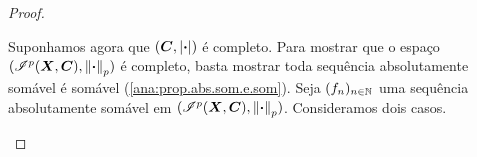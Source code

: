 \begin{proof}
\begin{enumerate}
Suponhamos agora que $(\bm C,\left\vert{\bm{\cdot}}\right\vert)$ é completo. Para mostrar que o espaço $(\mathscr{I}^p(\bm X,\bm C),\left\Vert{\bm{\cdot}}\right\Vert_p)$ é completo, basta mostrar toda sequência absolutamente somável é somável (\ref{ana:prop.abs.som.e.som}). Seja $(f_n)_{n \in \mathbb{N}}$ uma sequência absolutamente somável em $(\mathscr{I}^p(\bm X,\bm C),\left\Vert{\bm{\cdot}}\right\Vert_p)$. Consideramos dois casos.
	\begin{enumerate}

	\begin{comment}

	\item Para $p \in \intfa{1}{\infty}$. Seja
		\begin{equation*}
		 M := \sum_{k \in \N} \nor{f_k}_p.
		 \end{equation*}
Segue da subaditividade de $\nor{\var}_p$ que, para todo $n \in \N$,
		\begin{equation*}
		\nor{\sum_{k \in [n]} \abs{f_k}}_p \leq \sum_{k \in [n]} \nor{f_k}_p \leq M < \infty,
		\end{equation*}
portanto
	\begin{equation*}
	\int \left( \sum_{k \in [n]} \abs{f_k} \right)^p \dd\med \leq M^p.
	\end{equation*}
Temos que, para todo $n \in \N$,
	\begin{equation*}
	0 \leq \sum_{k \in [n]} \abs{f_k} \leq \sum_{k \in [n+1]} \abs{f_k},
	\end{equation*}
logo o limite pontual $\sum_{k \in \N} \abs{f_k}$ tem valores em $\intff{0}{\infty}$ e é mensurável. Pelo teorema da convergência monótona temos que
	\begin{equation*}
	\int \left( \sum_{k \in \N} \abs{f_k} \right)^p \dd\med \leq M^p.
	\end{equation*}
Portanto $\left( \sum_{k \in \N} \abs{f_k} \right)^p$ é integrável e, para quase todo $x \in X$, $\sum_{k \in \N} \abs{f_k(x)} \in \intfa{0}{\infty}$. Assim, para quase todo todo $x \in X$, a sequência $(f_k(x))_{n \in \N}$ é absolutamente somável em $\bm C$, portanto é somável e está definido o limite pontual
	\begin{equation*}
	s(x) := \sum_{k \in \N} f_k(x).
	\end{equation*}
A função $s$ está definida para quase todo $x \in X$, é mensurável e, para todo $n \in \N$, segue da continuidade e da subaditividade de $\abs{\var}$ que
	\begin{equation*}
	\abs{s} = \lim_{n \to \infty} \abs{\sum_{k \in [n]} f_k} \leq \lim_{n \to \infty} \sum_{k \in [n]} \abs{f_k} \leq \sum_{k \in \N} \abs{f_k},
	\end{equation*}
portanto
	\begin{equation*}
	\nor{s}_p = \left( \int \abs{s}^p \dd\med \right)^{p^{-1}} \leq \left( \int \abs{\sum_{k \in \N} \abs{f_k}}^p \dd\med \right)^{p^{-1}} = \nor{\sum_{k \in \N} \abs{f_k}}_p,
	\end{equation*}
o que mostra que $s \in \Intg^p(\bm X, \bm C)$.



\end{comment}
\end{enumerate}
\end{enumerate}
\end{proof}
